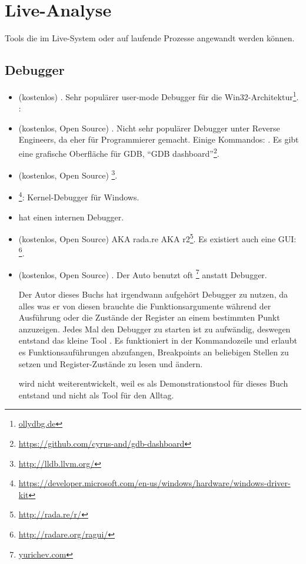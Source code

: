 \section{Live-Analyse}

Tools die im Live-System oder auf laufende Prozesse angewandt werden können.

\subsection{Debugger}

\myindex{\olly}

\begin{itemize}
\item (kostenlos) .
Sehr populärer user-mode Debugger für die Win32-Architektur\footnote{\href{http://go.yurichev.com/17032}{ollydbg.de}}.
\ShortHotKeyCheatsheet: 

\item (kostenlos, Open Source) .
Nicht sehr populärer Debugger unter Reverse Engineers, da eher für Programmierer gemacht.
Einige Kommandos: .
Es gibt eine grafische Oberfläche für GDB, ``GDB dashboard''\footnote{\url{https://github.com/cyrus-and/gdb-dashboard}}.

\item (kostenlos, Open Source) \footnote{\url{http://lldb.llvm.org/}}.

\item {}\footnote{\url{https://developer.microsoft.com/en-us/windows/hardware/windows-driver-kit}}:
Kernel-Debugger für Windows.

\item {} hat einen internen Debugger.

\item (kostenlos, Open Source)  \ac{AKA} rada.re \ac{AKA} r2\footnote{\url{http://rada.re/r/}}.
Es existiert auch eine GUI: \footnote{\url{http://radare.org/ragui/}}.

\item (kostenlos, Open Source) .
\label{tracer}
Der Auto benutzt oft 
\footnote{\href{http://go.yurichev.com/17338}{yurichev.com}}
anstatt Debugger.

Der Autor dieses Buchs hat irgendwann aufgehört Debugger zu nutzen, da alles was er von diesen
brauchte die Funktionsargumente während der Ausführung oder die Zustände der Register an einem
bestimmten Punkt anzuzeigen.
Jedes Mal den Debugger zu starten ist zu aufwändig, deswegen entstand das kleine Tool .
Es funktioniert in der Kommandozeile und erlaubt es Funktionsauführungen abzufangen,
Breakpoints an beliebigen Stellen zu setzen und Register-Zustände zu lesen und ändern.

 wird nicht weiterentwickelt, weil es als Demonstrationstool für dieses Buch entstand
und nicht als Tool für den Alltag.
\end{itemize}

